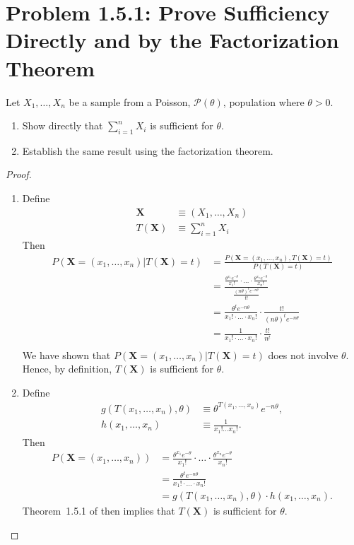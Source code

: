 \documentclass{amsbook}
\theoremstyle{definition}
\theoremstyle{remark}
\numberwithin{section}{chapter}
\numberwithin{equation}{chapter}
\begin{document}
\section{Problem 1.5.1: Prove Sufficiency Directly and by the Factorization Theorem}
Let $X_1,\dots,X_n$ be a sample from a Poisson, $\mathcal{P}(\theta)$, population where $\theta>0$.
\begin{enumerate}[label=(\alph*)]
\item Show directly that $\sum_{i=1}^nX_i$ is sufficient for $\theta$.
\item Establish the same result using the factorization theorem.
\end{enumerate}
\begin{proof}
\begin{enumerate}[label=(\alph*)]
\item Define\[
\begin{split}
\mathbf{X}&\equiv(X_1,\dots,X_n)\\
T(\mathbf{X})&\equiv\sum_{i=1}^nX_i
\end{split}
\]Then\[
\begin{split}
P(\mathbf{X}=(x_1,\dots,x_n)|T(\mathbf{X})=t)&=\frac{P(\mathbf{X}=(x_1,\dots,x_n),T(\mathbf{X})=t)}{P(T(\mathbf{X})=t)}\\
&=\frac{\frac{\theta^{x_1}e^{-\theta}}{x_1!}\cdot\dots\cdot\frac{\theta^{x_n}e^{-\theta}}{x_n!}}{\frac{(n\theta)^te^{-n\theta}}{t!}}\\
&=\frac{\theta^te^{-n\theta}}{x_1!\cdot\dots\cdot x_n!}\cdot\frac{t!}{(n\theta)^te^{-n\theta}}\\
&=\frac{1}{x_1!\cdot\dots\cdot x_n!}\cdot\frac{t!}{n^t}\\
\end{split}
\]We have shown that $P(\mathbf{X}=(x_1,\dots,x_n)|T(\mathbf{X})=t)$ does not involve $\theta$. Hence, by definition, $T(\mathbf{X})$ is sufficient for $\theta$.
\item Define\[
\begin{split}
g(T(x_1,\dots,x_n),\theta)&\equiv\theta^{T(x_1,\dots,x_n)}e^{-n\theta},\\
h(x_1,\dots,x_n)&\equiv\frac{1}{x_1!\dots x_n!}.
\end{split}
\]Then\[
\begin{split}
P(\mathbf{X}=(x_1,\dots,x_n))&=\frac{\theta^{x_1}e^{-\theta}}{x_1!}\cdot\dots\cdot\frac{\theta^{x_n}e^{-\theta}}{x_n!}\\
&=\frac{\theta^te^{-n\theta}}{x_1!\cdot\dots\cdot x_n!}\\
&=g(T(x_1,\dots,x_n),\theta)\cdot h(x_1,\dots,x_n).
\end{split}
\]Theorem~1.5.1 of \cite{bickel2015mathematical} then implies that $T(\mathbf{X})$ is sufficient for $\theta$.
\end{enumerate}
\end{proof}
\end{document}
